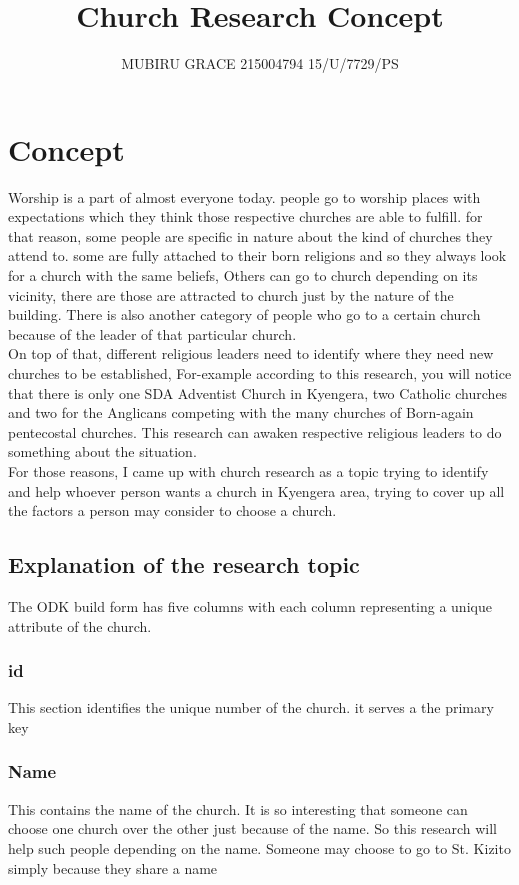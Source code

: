 \documentclass[11pt, oneside]{article}   	%
\title{Church Research Concept}
\author{MUBIRU GRACE
215004794
15/U/7729/PS}
\date{}							%
\begin{document}
\maketitle
\section{Concept}
Worship is a part of almost everyone today. people go to worship places with expectations which they think those respective churches are able to fulfill.
for that reason, some people are specific in nature about the kind of churches they attend to. 
some are fully attached to their born religions and so they always  look for a church with the same beliefs, 
Others can go to church depending on its vicinity, 
there are those are attracted to church just by the nature of the building.
There is also another category of people who go to a certain church because of the leader of that particular church.
\\   
{  On top of that, different religious leaders need to identify where they need new churches to be established, For-example according to this research, you will notice that there is only one SDA Adventist Church in Kyengera, two Catholic churches and  two for the Anglicans competing with the many churches of Born-again pentecostal churches. This research can awaken respective religious leaders to do something about the situation.}
\\   
For those reasons, I came up with church research as a topic trying to identify and help whoever person wants a church in Kyengera area, trying to cover up all the factors a person may consider to choose a church.


\subsection{Explanation of the research topic}
The ODK build form has five columns with each column representing a unique attribute of the church.
\subsubsection{id}
This section identifies the unique number of the church. it serves a the primary key

\subsubsection{Name}
This contains the name of the church. It is so interesting that someone can choose one church over the other just because of the name. So this research will help such people depending on the name. Someone may choose to go to St. Kizito simply because they share a name
\end{document}
